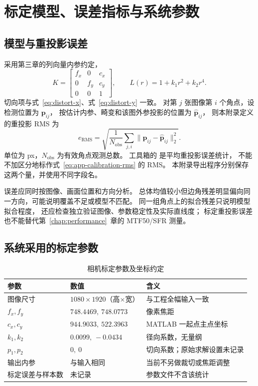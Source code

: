 \section{标定模型、误差指标与系统参数}
\subsection{模型与重投影误差}
采用第三章的列向量内参约定，
\begin{equation}
K=\begin{bmatrix}f_x&0&c_x\\0&f_y&c_y\\0&0&1\end{bmatrix},
\qquad L(r)=1+k_1r^2+k_2r^4.
\end{equation}
切向项与式~\eqref{eq:distort-x}、式~\eqref{eq:distort-y} 一致。
对第 $j$ 张图像第 $i$ 个角点，设检测位置为 $\boldsymbol p_{ij}$，
按估计内参、畸变和该图外参投影的位置为 $\hat{\boldsymbol p}_{ij}$，
则本附录定义的重投影 RMS 为
\begin{equation}
e_{\mathrm{RMS}}=
\sqrt{\frac{1}{N_{\mathrm{obs}}}\sum_{j,i}
\|\boldsymbol p_{ij}-\hat{\boldsymbol p}_{ij}\|_2^2}.
\label{eq:app-calibration-rms}
\end{equation}
单位为 px，$N_{\mathrm{obs}}$ 为有效角点观测总数。
工具箱的  是平均重投影误差统计，
不能不加区分地标作式~\eqref{eq:app-calibration-rms} 的 RMS\cite{matlab-camera-parameters}。
本附录导出程序分别保存这两个量，并使用不同字段名。

误差应同时按图像、画面位置和方向分析。
总体均值较小但边角残差明显偏向同一方向，可能说明覆盖不足或模型不匹配。
同一组角点上的拟合残差只说明模型拟合程度，
还应检查独立验证图像、参数稳定性及实际直线度；
标定重投影误差也不能替代第~\ref{chap:performance}~章的 MTF50/SFR 测量。

\subsection{系统采用的标定参数}
\begin{table}[htbp]\centering\small
\caption{相机标定参数及坐标约定}\label{tab:app-calibration-parameters}
\begin{tabularx}{\textwidth}{>{\raggedright\arraybackslash}p{3.4cm}YY}
\toprule
参数 & 数值 & 含义 \\
\midrule
图像尺寸 & $1080\times1920$（高$\times$宽） & 与工程全幅输入一致 \\
$f_x,f_y$ & $748.4469,\ 748.0773$ & 像素焦距 \\
$c_x,c_y$ & $944.9033,\ 522.3963$ & MATLAB 一起点主点坐标 \\
$k_1,k_2$ & $0.0099,\ -0.0434$ & 径向系数，无量纲 \\
$p_1,p_2$ & $0,\ 0$ & 切向系数；原始求解设置未记录 \\
输出内参 & 与输入相同 & 当前不另做裁切或焦距调整 \\
标定误差与样本数 & 未记录 & 参数文件不含该统计 \\
\bottomrule
\end{tabularx}
\end{table}

